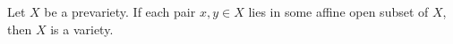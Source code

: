 Let $X$ be a prevariety. If each pair $x, y \in X$ lies in some affine open subset of $X$, then $X$ is a variety.

